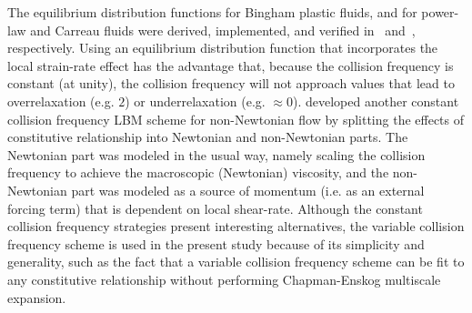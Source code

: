 The equilibrium distribution functions for Bingham plastic fluids, and for power-law and Carreau fluids were derived, implemented, and verified in~\cite{wang2008lattice} and~\cite{yoshino2007numerical}, respectively.
Using an equilibrium distribution function that incorporates the local strain-rate effect has the advantage that, because the collision frequency is constant (at unity), the collision frequency will not approach values that lead to overrelaxation (e.g. $2$) or underrelaxation (e.g. $\approx 0$).
\cite{wang2011lattice} developed another constant collision frequency LBM scheme for non-Newtonian flow by splitting the effects of constitutive relationship into Newtonian and non-Newtonian parts.
The Newtonian part was modeled in the usual way, namely scaling the collision frequency to achieve the macroscopic (Newtonian) viscosity, and the non-Newtonian part was modeled as a source of momentum (i.e. as an external forcing term) that is dependent on local shear-rate.
Although the constant collision frequency strategies present interesting alternatives, the variable collision frequency scheme is used in the present study because of its simplicity and generality, such as the fact that a variable collision frequency scheme can be fit to any constitutive relationship without performing Chapman-Enskog multiscale expansion.

